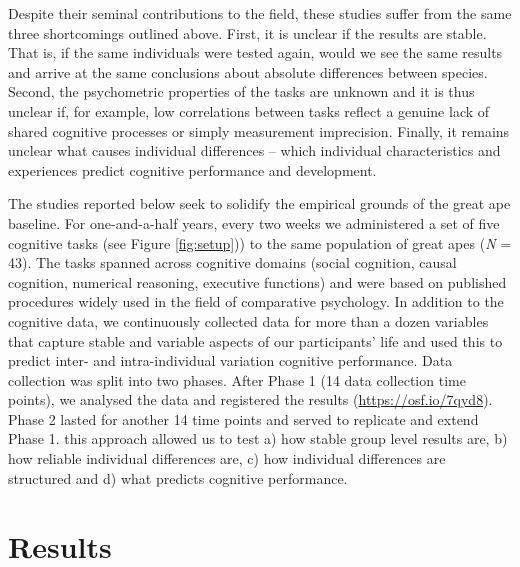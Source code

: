 \documentclass[
  man,floatsintext]{apa6}
\begin{document}
Despite their seminal contributions to the field, these studies suffer from the same three shortcomings outlined above. First, it is unclear if the results are stable. That is, if the same individuals were tested again, would we see the same results and arrive at the same conclusions about absolute differences between species. Second, the psychometric properties of the tasks are unknown and it is thus unclear if, for example, low correlations between tasks reflect a genuine lack of shared cognitive processes or simply measurement imprecision. Finally, it remains unclear what causes individual differences -- which individual characteristics and experiences predict cognitive performance and development.

The studies reported below seek to solidify the empirical grounds of the great ape baseline. For one-and-a-half years, every two weeks we administered a set of five cognitive tasks (see Figure \ref{fig:setup})) to the same population of great apes (\emph{N} = 43). The tasks spanned across cognitive domains (social cognition, causal cognition, numerical reasoning, executive functions) and were based on published procedures widely used in the field of comparative psychology. In addition to the cognitive data, we continuously collected data for more than a dozen variables that capture stable and variable aspects of our participants' life and used this to predict inter- and intra-individual variation cognitive performance. Data collection was split into two phases. After Phase 1 (14 data collection time points), we analysed the data and registered the results (\url{https://osf.io/7qyd8}). Phase 2 lasted for another 14 time points and served to replicate and extend Phase 1. this approach allowed us to test a) how stable group level results are, b) how reliable individual differences are, c) how individual differences are structured and d) what predicts cognitive performance.

\hypertarget{results}{%
\section{Results}\label{results}}
\end{document}
